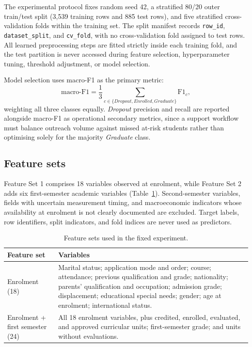 \documentclass[11pt,a4paper]{article}
\newcommand{\Dropout}{\textit{Dropout}}
\newcommand{\Enrolled}{\textit{Enrolled}}
\newcommand{\Graduate}{\textit{Graduate}}
\begin{document}
The experimental protocol fixes random seed 42, a stratified 80/20 outer train/test split (3,539
training rows and 885 test rows), and five stratified cross-validation folds within the training
set. The split manifest records \texttt{row\_id}, \texttt{dataset\_split}, and \texttt{cv\_fold},
with no cross-validation fold assigned to test rows. All learned preprocessing steps are fitted
strictly inside each training fold, and the test partition is never accessed during feature
selection, hyperparameter tuning, threshold adjustment, or model selection.

Model selection uses macro-F1 as the primary metric:
\begin{equation}
  \mathrm{macro\mbox{-}F1} = \frac{1}{3}\sum_{c\in\{\Dropout,\Enrolled,\Graduate\}}
  \mathrm{F1}_c,
\end{equation}
weighting all three classes equally. \Dropout{} precision and recall are reported alongside
macro-F1 as operational secondary metrics, since a support workflow must balance outreach volume
against missed at-risk students rather than optimising solely for the majority \Graduate{} class.

\subsection{Feature sets}

Feature Set 1 comprises 18 variables observed at enrolment, while Feature Set 2 adds six
first-semester academic variables (Table~\ref{tab:features}). Second-semester variables, fields
with uncertain measurement timing, and macroeconomic indicators whose availability at enrolment is
not clearly documented are excluded. Target labels, row identifiers, split indicators, and fold
indices are never used as predictors.

\begin{table}[H]
\centering
\caption{Feature sets used in the fixed experiment.}
\label{tab:features}
\begin{tabularx}{\textwidth}{>{\raggedright\arraybackslash}p{}X}
\toprule
Feature set & Variables \\
\midrule
Enrolment (18) & Marital status; application mode and order; course; attendance; previous
qualification and grade; nationality; parents' qualification and occupation; admission grade;
displacement; educational special needs; gender; age at enrolment; international status. \\
Enrolment + first semester (24) & All 18 enrolment variables, plus credited, enrolled,
evaluated, and approved curricular units; first-semester grade; and units without evaluations. \\
\bottomrule
\end{tabularx}
\end{table}
\end{document}
